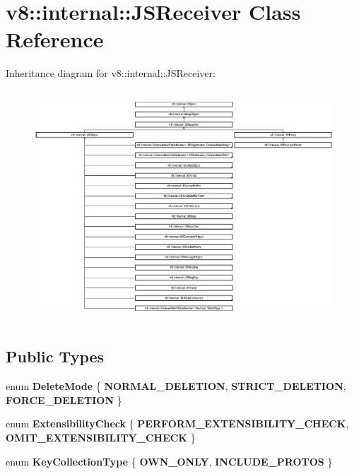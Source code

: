 \hypertarget{classv8_1_1internal_1_1_j_s_receiver}{}\section{v8\+:\+:internal\+:\+:J\+S\+Receiver Class Reference}
\label{classv8_1_1internal_1_1_j_s_receiver}
Inheritance diagram for v8\+:\+:internal\+:\+:J\+S\+Receiver\+:\begin{figure}[H]
\begin{center}
\leavevmode
\includegraphics[height=8.691796cm]{classv8_1_1internal_1_1_j_s_receiver}
\end{center}
\end{figure}
\subsection*{Public Types}
\begin{DoxyCompactItemize}
\item 
\hypertarget{classv8_1_1internal_1_1_j_s_receiver_ad389cc1753593f03525894c2946559db}{}enum {\bfseries Delete\+Mode} \{ {\bfseries N\+O\+R\+M\+A\+L\+\_\+\+D\+E\+L\+E\+T\+I\+O\+N}, 
{\bfseries S\+T\+R\+I\+C\+T\+\_\+\+D\+E\+L\+E\+T\+I\+O\+N}, 
{\bfseries F\+O\+R\+C\+E\+\_\+\+D\+E\+L\+E\+T\+I\+O\+N}
 \}\label{classv8_1_1internal_1_1_j_s_receiver_ad389cc1753593f03525894c2946559db}

\item 
\hypertarget{classv8_1_1internal_1_1_j_s_receiver_a1c43df13bec1230d60d09cddaa442bc4}{}enum {\bfseries Extensibility\+Check} \{ {\bfseries P\+E\+R\+F\+O\+R\+M\+\_\+\+E\+X\+T\+E\+N\+S\+I\+B\+I\+L\+I\+T\+Y\+\_\+\+C\+H\+E\+C\+K}, 
{\bfseries O\+M\+I\+T\+\_\+\+E\+X\+T\+E\+N\+S\+I\+B\+I\+L\+I\+T\+Y\+\_\+\+C\+H\+E\+C\+K}
 \}\label{classv8_1_1internal_1_1_j_s_receiver_a1c43df13bec1230d60d09cddaa442bc4}

\item 
\hypertarget{classv8_1_1internal_1_1_j_s_receiver_a32c97c638255a123b657f4463b47154b}{}enum {\bfseries Key\+Collection\+Type} \{ {\bfseries O\+W\+N\+\_\+\+O\+N\+L\+Y}, 
{\bfseries I\+N\+C\+L\+U\+D\+E\+\_\+\+P\+R\+O\+T\+O\+S}
 \}\label{classv8_1_1internal_1_1_j_s_receiver_a32c97c638255a123b657f4463b47154b}

\end{DoxyCompactItemize}

